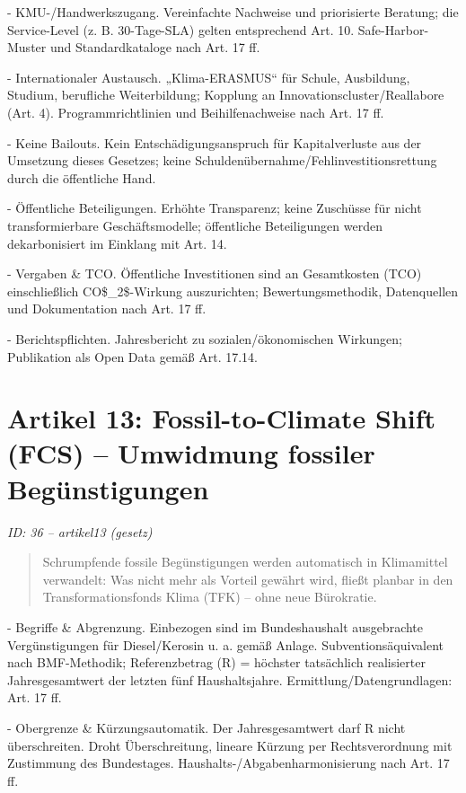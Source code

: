 \documentclass[12pt,a4paper]{scrartcl}
\begin{document}
- KMU-/Handwerkszugang. Vereinfachte Nachweise und priorisierte Beratung; die Service-Level (z. B. 30-Tage-SLA) gelten entsprechend Art. 10. Safe-Harbor-Muster und Standardkataloge nach Art. 17 ff.

- Internationaler Austausch. „Klima-ERASMUS“ für Schule, Ausbildung, Studium, berufliche Weiterbildung; Kopplung an Innovationscluster/Reallabore (Art. 4). Programmrichtlinien und Beihilfenachweise nach Art. 17 ff.

- Keine Bailouts. Kein Entschädigungsanspruch für Kapitalverluste aus der Umsetzung dieses Gesetzes; keine Schuldenübernahme/Fehlinvestitionsrettung durch die öffentliche Hand.

- Öffentliche Beteiligungen. Erhöhte Transparenz; keine Zuschüsse für nicht transformierbare Geschäftsmodelle; öffentliche Beteiligungen werden dekarbonisiert im Einklang mit Art. 14.

- Vergaben \& TCO. Öffentliche Investitionen sind an Gesamtkosten (TCO) einschließlich CO\$\_2\$-Wirkung auszurichten; Bewertungsmethodik, Datenquellen und Dokumentation nach Art. 17 ff.

- Berichtspflichten. Jahresbericht zu sozialen/ökonomischen Wirkungen; Publikation als Open Data gemäß Art. 17.14.


\section[Artikel 13: Fossil-to-Climate Shift (FCS) -- Umwidmung fossiler Begünstigungen]{Artikel 13: Fossil-to-Climate Shift (FCS) -- Umwidmung fossiler Begünstigungen}
\noindent\textit{ID: 36 -- artikel13 (gesetz)}

\begin{quote}
Schrumpfende fossile Begünstigungen werden automatisch in Klimamittel verwandelt: Was nicht mehr als Vorteil gewährt wird, fließt planbar in den Transformationsfonds Klima (TFK) -- ohne neue Bürokratie.
\end{quote}

- Begriffe \& Abgrenzung. Einbezogen sind im Bundeshaushalt ausgebrachte Vergünstigungen für Diesel/Kerosin u. a. gemäß Anlage. Subventionsäquivalent nach BMF-Methodik; Referenzbetrag (R) = höchster tatsächlich realisierter Jahresgesamtwert der letzten fünf Haushaltsjahre. Ermittlung/Datengrundlagen: Art. 17 ff.

- Obergrenze \& Kürzungsautomatik. Der Jahresgesamtwert darf R nicht überschreiten. Droht Überschreitung, lineare Kürzung per Rechtsverordnung mit Zustimmung des Bundestages. Haushalts-/Abgabenharmonisierung nach Art. 17 ff.
\end{document}
